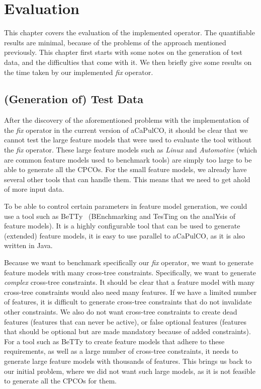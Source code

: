 \chapter{Evaluation}\label{ch:evaluation}
This chapter covers the evaluation of the implemented operator. The quantifiable
results are minimal, because of the problems of the approach mentioned previously.
This chapter first starts with some notes on the generation of test data, and the
difficulties that come with it. We then briefly give some results on the time
taken by our implemented \emph{fix} operator.

\section{(Generation of) Test Data}\label{sec:testdata}
After the discovery of the aforementioned problems with the implementation of the
\emph{fix} operator in the current version of aCaPulCO, it should be clear that
we cannot test the large feature models that were used to evaluate the tool without
the \emph{fix} operator. These large feature models such as \emph{Linux} and
\emph{Automotive} (which are common feature models used to benchmark tools) are
simply too large to be able to generate all the CPCOs. For the small feature models,
we already have several other tools that can handle them. This means that we
need to get ahold of more input data.

To be able to control certain parameters in feature model generation, we could use
a tool such as BeTTy~\cite{segura2012betty} (BEnchmarking and TesTing on the analYsis
of feature models). It is a highly configurable tool that can be used to generate
(extended) feature models, it is easy to use parallel to aCaPulCO, as it is also
written in Java.

Because we want to benchmark specifically our \emph{fix} operator, we want to
generate feature models with many cross-tree constraints. Specifically, we want to
generate \emph{complex} cross-tree constraints. It should be clear that a feature
model with many cross-tree constraints would also need many features. If we have
a limited number of features, it is difficult to generate cross-tree constraints
that do not invalidate other constraints. We also do not want cross-tree constraints
to create dead features (features that can never be active), or false optional 
features (features that should be optional but are made mandatory because of
added constraints). For a tool such as BeTTy to create feature models that adhere
to these requirements, as well as a large number of cross-tree constraints, it needs
to generate large feature models with thousands of features. This brings us back to
our initial problem, where we did not want such large models, as it is not feasible
to generate all the CPCOs for them.

